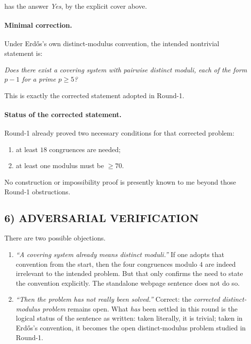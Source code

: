 has the answer \emph{Yes}, by the explicit cover above.

\paragraph{Minimal correction.}
Under Erd\H{o}s's own distinct-modulus convention, the intended nontrivial statement is:

\medskip
\centerline{\emph{Does there exist a covering system with pairwise distinct moduli, each of the form $p-1$ for a prime $p\ge 5$?}}
\medskip

This is exactly the corrected statement adopted in Round-1.

\paragraph{Status of the corrected statement.}
Round-1 already proved two necessary conditions for that corrected problem:

\begin{enumerate}
\item at least $18$ congruences are needed;
\item at least one modulus must be $\ge 70$.
\end{enumerate}

No construction or impossibility proof is presently known to me beyond those Round-1 obstructions.

\subsection*{6) ADVERSARIAL VERIFICATION}

There are two possible objections.

\begin{enumerate}
\item \emph{``A covering system already means distinct moduli.''}  
If one adopts that convention from the start, then the four congruences modulo $4$ are indeed irrelevant to the intended problem.  But that only confirms the need to state the convention explicitly.  The standalone webpage sentence does not do so.
\item \emph{``Then the problem has not really been solved.''}  
Correct: the \emph{corrected distinct-modulus problem} remains open.  What \emph{has} been settled in this round is the logical status of the sentence as written: taken literally, it is trivial; taken in Erd\H{o}s's convention, it becomes the open distinct-modulus problem studied in Round-1.
\end{enumerate}

